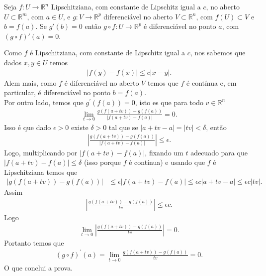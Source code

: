 \begin{homeworkProblem}[Seção 2-1]
  Seja $f : U \to \mathbb{R}^n$ Lipschitziana, com constante de Lipschitz igual a $c$, no aberto $U \subset \mathbb{R}^m$, com $a \in U$, e $g : V \to \mathbb{R}^p$ diferenciável no aberto $V \subset \mathbb{R}^n$, com $f(U) \subset V$ e $b = f(a)$. Se $g'(b) = 0$ então $g \circ f : U \to \mathbb{R}^p$ é diferenciável no ponto $a$, com $(g \circ f)'(a) = 0$.
  \begin{solution}
    Como $f$ é Lipschitziana, com constante de Lipschitz igual a $c$, nos sabemos que dados $x,y\in U$ temos 
    \begin{align*}
      |f(y)-f(x)|\leq c|x-y|.
    \end{align*}
    Alem mais, como $f$ é diferenciável no aberto $V$ temos que $f$ é contínua e, em particular, é diferenciável no ponto $b=f(a)$.\\
    Por outro lado, temos que $g^{\prime}(f(a))=0$, isto es que para todo $v\in\mathbb{R}^{n}$ 
    \begin{align*}
      \lim_{t \to 0}\frac{g(f(a+tv))-g(f(a))}{|f(a+tv)-f(a)|}=0.
    \end{align*}
    Isso é que dado $\epsilon>0$ existe $\delta>0$ tal que se $|a+tv-a|=|tv|<\delta$, então
    \begin{align*}
      \left| \frac{g(f(a+tv))-g(f(a))}{|f(a+tv)-f(a)|} \right|\leq \epsilon.
    \end{align*}
    Logo, multiplicando por $|f(a+tv)-f(a)|$, fixando um $t$ adecuado para que $|f(a+tv)-f(a)|\leq \delta$ (isso porque $f$ é contínua) e usando que $f$ é Lipschitziana temos que
    \begin{align*}
      |g(f(a+tv))-g(f(a))|&\leq\epsilon|f(a+tv)-f(a)|\leq \epsilon c|a+tv-a|\leq \epsilon c|tv|.
    \end{align*}
    Assim
    \begin{align*}
      \left| \frac{g(f(a+tv))-g(f(a))}{tv} \right|\leq\epsilon c.
    \end{align*}
    Logo
    \begin{align*}
      \lim_{t \to 0}\left| \frac{g(f(a+tv))-g(f(a))}{tv} \right|=0.
    \end{align*}
    Portanto temos que
    \begin{align*}
      (g\circ f)^{\prime}(a)=\lim_{t \to 0}\frac{g(f(a+tv))-g(f(a))}{tv}=0.
    \end{align*}
    O que conclui a prova.
  \end{solution}
\end{homeworkProblem}
